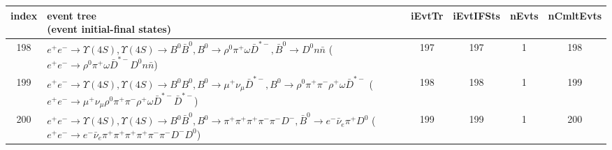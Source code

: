 \documentclass[landscape]{article}
\begin{document}
\clearpage

\begin{table}[htbp!]
\small
\centering
\begin{tabular}{|c|>{\centering}p{18cm}|c|c|c|c|}
\hline
index & \thead{event tree \\ (event initial-final states)} & iEvtTr & iEvtIFSts & nEvts & nCmltEvts \\
\hline
198 & \makecell{ $ 
e^{+} e^{-} \rightarrow \Upsilon(4S) ,
\Upsilon(4S) \rightarrow B^{0} \bar{B}^{0} ,
B^{0} \rightarrow \rho^{0} \pi^{+} \omega \bar{D}^{*-} ,
\bar{B}^{0} \rightarrow D^{0} n \bar{n} 
$ \\ ($
e^{+} e^{-} \rightarrow \rho^{0} \pi^{+} \omega \bar{D}^{*-} D^{0} n \bar{n} 
$) } & 197 & 197 & 1 & 198 \\
\hline
199 & \makecell{ $ 
e^{+} e^{-} \rightarrow \Upsilon(4S) ,
\Upsilon(4S) \rightarrow B^{0} B^{0} ,
B^{0} \rightarrow \mu^{+} \nu_{\mu} \bar{D}^{*-} ,
B^{0} \rightarrow \rho^{0} \pi^{+} \pi^{-} \rho^{+} \omega \bar{D}^{*-} 
$ \\ ($
e^{+} e^{-} \rightarrow \mu^{+} \nu_{\mu} \rho^{0} \pi^{+} \pi^{-} \rho^{+} \omega \bar{D}^{*-} \bar{D}^{*-} 
$) } & 198 & 198 & 1 & 199 \\
\hline
200 & \makecell{ $ 
e^{+} e^{-} \rightarrow \Upsilon(4S) ,
\Upsilon(4S) \rightarrow B^{0} \bar{B}^{0} ,
B^{0} \rightarrow \pi^{+} \pi^{+} \pi^{+} \pi^{-} \pi^{-} D^{-} ,
\bar{B}^{0} \rightarrow e^{-} \bar{\nu}_{e} \pi^{+} D^{0} 
$ \\ ($
e^{+} e^{-} \rightarrow e^{-} \bar{\nu}_{e} \pi^{+} \pi^{+} \pi^{+} \pi^{+} \pi^{-} \pi^{-} D^{-} D^{0} 
$) } & 199 & 199 & 1 & 200 \\
\hline
\end{tabular}
\end{table}

\clearpage
\end{document}
